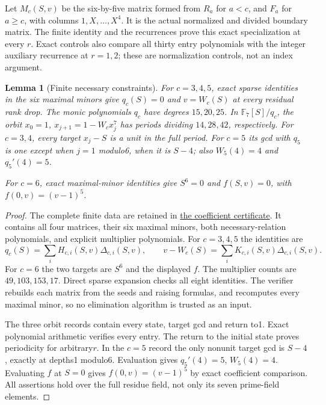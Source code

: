 \documentclass[11pt]{article}
\newtheorem{lemma}{Lemma}\newtheorem{theorem}{Theorem}
\begin{document}
Let $M_c(S,v)$ be the six-by-five matrix formed from $R_a$
for $a<c$, and $F_a$ for $a\ge c$, with columns $1,X,\ldots,X^4$.
It is the actual normalized and divided boundary matrix.
The finite identity and the recurrences prove this exact specialization
at every $r$. Exact controls also compare all thirty entry polynomials
with the integer auxiliary recurrence at $r=1,2$; these are normalization
controls, not an index argument.

\begin{lemma}[Finite necessary constraints]\label{lem:certificate}
For $c=3,4,5$, exact sparse identities in the six maximal minors
give $q_c(S)=0$ and $v=W_c(S)$ at every residual rank drop.
The monic polynomials $q_c$ have degrees $15,20,25$.
In $\mathbb F_7[S]/q_c$, the orbit
$x_0=1$, $x_{j+1}=1-W_cx_j^7$ has periods dividing $14,28,42$,
respectively.
For $c=3,4$, every target $x_j-S$ is a unit in the full period.
For $c=5$ its gcd with $q_5$ is one except when $j=1$ modulo6,
when it is $S-4$; also $W_5(4)=4$ and $q_5'(4)=5$.

For $c=6$, exact maximal-minor identities give $S^6=0$ and
$f(S,v)=0$, with $f(0,v)=(v-1)^5$.
\end{lemma}
\begin{proof}
The complete finite data are retained in
\href{gap_six_small_offset_families_certificate.json}
{the coefficient certificate}.
It contains all four matrices, their six maximal minors, both
necessary-relation polynomials, and explicit multiplier polynomials.
For $c=3,4,5$ the identities are
\[
 q_c(S)=\sum_iH_{c,i}(S,v)\Delta_{c,i}(S,v),\qquad
 v-W_c(S)=\sum_iK_{c,i}(S,v)\Delta_{c,i}(S,v).
\]
For $c=6$ the two targets are $S^6$ and the displayed $f$.
The multiplier counts are $49,103,153,17$.
Direct sparse expansion checks all eight identities.
The verifier rebuilds each matrix from the seeds and raising formulas,
and recomputes every maximal minor, so no elimination algorithm is
trusted as an input.

The three orbit records contain every state, target gcd and return
to1. Exact polynomial arithmetic verifies every entry.
The return to the initial state proves periodicity for arbitrary$r$.
In the $c=5$ record the only nonunit target gcd is $S-4$, exactly
at depths1 modulo6. Evaluation gives $q_5'(4)=5$, $W_5(4)=4$.
Evaluating $f$ at $S=0$ gives $f(0,v)=(v-1)^5$ by exact
coefficient comparison. All assertions hold over the full residue
field, not only its seven prime-field elements.
\end{proof}
\end{document}
